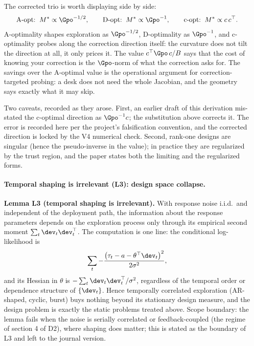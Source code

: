 The corrected trio is worth displaying side by side:
\begin{equation*}
\text{A-opt:}\;\; M^{*} \propto \Gpo^{-1/2},
\qquad
\text{D-opt:}\;\; M^{*} \propto \Gpo^{-1},
\qquad
\text{c-opt:}\;\; M^{*} \propto c\,c^\top .
\end{equation*}
A-optimality shapes exploration as $\Gpo^{-1/2}$, D-optimality as
$\Gpo^{-1}$, and c-optimality probes along the correction direction itself:
the curvature does not tilt the direction at all, it only prices it. The
value $c^\top \Gpo\, c / B$ says that the cost of knowing your correction
is the $\Gpo$-norm of what the correction asks for. The savings over the
A-optimal value is the operational argument for correction-targeted
probing: a desk does not need the whole Jacobian, and the geometry says
exactly what it may skip.

Two caveats, recorded as they arose. First, an earlier draft of this
derivation mis-stated the c-optimal direction as $\Gpo^{-1} c$; the
substitution above corrects it. The error is recorded here per the
project's falsification convention, and the corrected direction is locked
by the V4 numerical check. Second, rank-one designs are singular (hence the
pseudo-inverse in the value); in practice they are regularized by the trust
region, and the paper states both the limiting and the regularized forms.

\paragraph{Temporal shaping is irrelevant (L3): design space collapse.}
\textbf{Lemma L3 (temporal shaping is irrelevant).} With response noise
i.i.d.\ and independent of the deployment path, the information about the
response parameters depends on the exploration process only through its
empirical second moment $\sum_t \dev_t \dev_t^\top$. The computation is one
line: the conditional log-likelihood is
\begin{equation*}
\sum_t -\frac{\big(\tau_t - a - \theta^\top \dev_t\big)^{2}}{2\sigma^{2}},
\end{equation*}
and its Hessian in $\theta$ is $-\sum_t \dev_t \dev_t^\top / \sigma^{2}$,
regardless of the temporal order or dependence structure of $\{\dev_t\}$.
Hence temporally correlated exploration (AR-shaped, cyclic, burst) buys
nothing beyond its stationary design measure, and the design problem is
exactly the static problems treated above. Scope boundary: the lemma fails
when the noise is serially correlated or feedback-coupled (the regime of
section 4 of D2), where shaping does matter; this is stated as the
boundary of L3 and left to the journal version.

